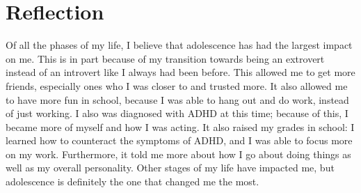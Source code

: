 \documentclass[12pt, letter]{article}
\begin{document}
	\pagebreak
	
	\section*{Reflection}
	
	Of all the phases of my life, I believe that adolescence has had the largest impact on me. This is in part because of my transition towards being an extrovert instead of an introvert like I always had been before. This allowed me to get more friends, especially ones who I was closer to and trusted more. It also allowed me to have more fun in school, because I was able to hang out and do work, instead of just working. I also was diagnosed with ADHD at this time; because of this, I became more of myself and how I was acting. It also raised my grades in school: I learned how to counteract the symptoms of ADHD, and I was able to focus more on my work. Furthermore, it told me more about how I go about doing things as well as my overall personality. Other stages of my life have impacted me, but adolescence is definitely the one that changed me the most.
	
\end{document}
